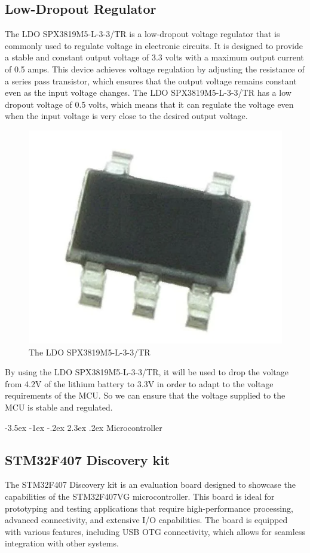 \documentclass[a4paper, twoside]{report}
\makeatletter
\renewcommand\section{\@startsection {section}{1}{-1em}%
  {-3.5ex \@plus -1ex \@minus -.2ex}%
  {2.3ex \@plus.2ex}%
  {\normalfont\Large\bfseries}}
\makeatother
\begin{document}
\subsection{Low-Dropout Regulator}
The LDO SPX3819M5-L-3-3/TR is a low-dropout voltage regulator that is commonly used to regulate voltage in electronic circuits. It is designed to provide a stable and constant output voltage of 3.3 volts with a maximum output current of 0.5 amps. This device achieves voltage regulation by adjusting the resistance of a series pass transistor, which ensures that the output voltage remains constant even as the input voltage changes. The LDO SPX3819M5-L-3-3/TR has a low dropout voltage of 0.5 volts, which means that it can regulate the voltage even when the input voltage is very close to the desired output voltage.
\begin{figure}[H]
    \begin{center}
    \includegraphics[width=.3\textwidth]{images/LDO.png}
    \caption{The LDO SPX3819M5-L-3-3/TR}
    \end{center}
\end{figure} 
By using the LDO SPX3819M5-L-3-3/TR, it will be used to drop the voltage from 4.2V of the lithium battery to 3.3V in order to adapt to the voltage requirements of the MCU. So we can ensure that the voltage supplied to the MCU is stable and regulated.

\section{Microcontroller}
\subsection{STM32F407 Discovery kit}
The STM32F407 Discovery kit is an evaluation board designed to showcase the capabilities of the STM32F407VG microcontroller. This board is ideal for prototyping and testing applications that require high-performance processing, advanced connectivity, and extensive I/O capabilities. The board is equipped with various features, including USB OTG connectivity, which allows for seamless integration with other systems.
\end{document}
